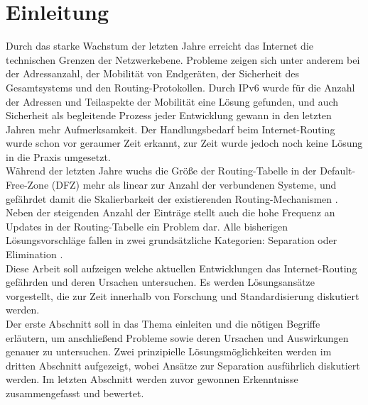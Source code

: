 \section{Einleitung}
Durch das starke Wachstum der letzten Jahre erreicht das Internet die technischen Grenzen der Netzwerkebene. Probleme zeigen sich unter anderem bei der Adressanzahl, der Mobilität von Endgeräten,  der Sicherheit des Gesamtsystems und den Routing-Protokollen. Durch IPv6 wurde für die Anzahl der Adressen und Teilaspekte der Mobilität eine Lösung gefunden, und auch Sicherheit als begleitende Prozess jeder Entwicklung gewann in den letzten Jahren mehr Aufmerksamkeit. Der Handlungsbedarf beim Internet-Routing wurde schon vor geraumer Zeit erkannt, zur Zeit wurde jedoch noch keine Lösung in die Praxis umgesetzt.\\
 
Während der letzten Jahre wuchs die Größe der Routing-Tabelle in der Default-Free-Zone (DFZ) mehr als linear zur Anzahl der verbundenen Systeme, und gefährdet damit die Skalierbarkeit der existierenden Routing-Mechanismen \cite{huston:2001:analyzing}\cite{Huston:aktuell:BGP}. Neben der steigenden Anzahl der Einträge stellt auch die hohe Frequenz an Updates in der Routing-Tabelle ein Problem dar. Alle bisherigen Lösungsvorschläge fallen in zwei grundsätzliche Kategorien: Separation oder Elimination \cite{jen:2008:start}. \\

Diese Arbeit soll aufzeigen welche aktuellen Entwicklungen das Internet-Routing gefährden und deren Ursachen untersuchen. Es werden Lösungsansätze vorgestellt, die zur Zeit innerhalb von Forschung und Standardisierung diskutiert werden. \\

Der erste Abschnitt soll in das Thema einleiten und die nötigen Begriffe erläutern, um anschließend Probleme sowie deren Ursachen und Auswirkungen genauer zu untersuchen. Zwei prinzipielle Lösungsmöglichkeiten werden im dritten Abschnitt aufgezeigt, wobei Ansätze zur Separation ausführlich diskutiert werden. Im letzten Abschnitt werden zuvor gewonnen Erkenntnisse zusammengefasst und bewertet.

 
